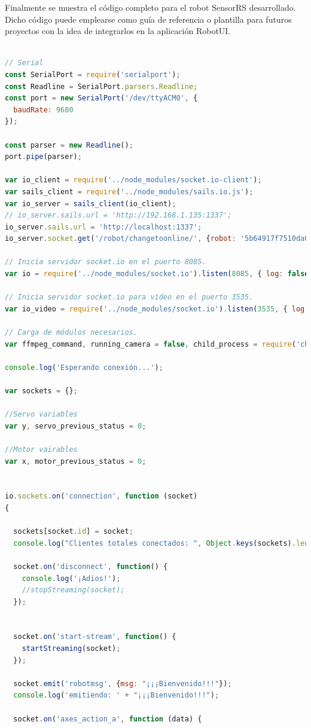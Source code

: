 Finalmente se muestra el código completo para el robot SensorRS desarrollado. Dicho código puede emplearse como guía de referencia o plantilla para futuros proyectos con la idea de integrarlos en la aplicación RobotUI.\\

\begin{lstlisting}[language=JavaScript]

// Serial
const SerialPort = require('serialport');
const Readline = SerialPort.parsers.Readline;
const port = new SerialPort('/dev/ttyACM0', {
  baudRate: 9600
});

const parser = new Readline();
port.pipe(parser);

var io_client = require('../node_modules/socket.io-client');
var sails_client = require('../node_modules/sails.io.js');
var io_server = sails_client(io_client);
// io_server.sails.url = 'http://192.168.1.135:1337';
io_server.sails.url = 'http://localhost:1337';
io_server.socket.get('/robot/changetoonline/', {robot: '5b64917f7510da0d68a140ec', online: true});

// Inicia servidor socket.io en el puerto 8085.
var io = require('../node_modules/socket.io').listen(8085, { log: false });

// Inicia servidor socket.io para vídeo en el puerto 3535.
var io_video = require('../node_modules/socket.io').listen(3535, { log: false });

// Carga de módulos necesarios.
var ffmpeg_command, running_camera = false, child_process = require('child_process');

console.log('Esperando conexión...');

var sockets = {};

//Servo variables
var y, servo_previous_status = 0;

//Motor vairables
var x, motor_previous_status = 0;


io.sockets.on('connection', function (socket)
{

  sockets[socket.id] = socket;
  console.log("Clientes totales conectados: ", Object.keys(sockets).length);

  socket.on('disconnect', function() {
    console.log('¡Adios!');
    //stopStreaming(socket);
  });


  socket.on('start-stream', function() {
    startStreaming(socket);
  });

  socket.emit('robotmsg', {msg: "¡¡¡Bienvenido!!!"});
  console.log('emitiendo: ' + "¡¡¡Bienvenido!!!");

  socket.on('axes_action_a', function (data) {


\end{lstlisting}
